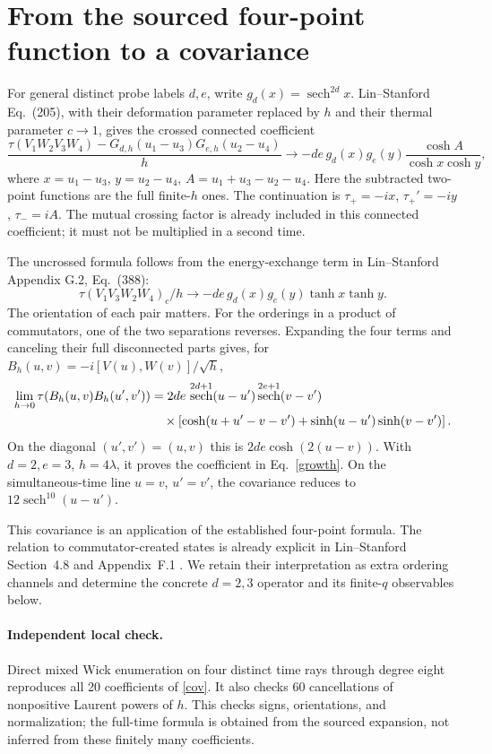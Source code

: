 \documentclass[11pt,a4paper]{article}
\newcommand{\av}[1]{\tau\!\left(#1\right)}
\DeclareMathOperator{\sech}{sech}
\begin{document}
\newpage
\section{From the sourced four-point function to a covariance}
For general distinct probe labels $d,e$, write
$g_d(x)=\sech^{2d}x$. Lin--Stanford Eq.~(205), with their deformation
parameter replaced by $h$ and their thermal parameter $c\to1$, gives
the crossed connected coefficient
\begin{equation}
 \frac{\av{V_1W_2V_3W_4}-G_{d,h}(u_1-u_3)G_{e,h}(u_2-u_4)}h
 \longrightarrow
 -de\,g_d(x)g_e(y)\frac{\cosh A}{\cosh x\cosh y},\label{cross}
\end{equation}
where $x=u_1-u_3$, $y=u_2-u_4$, $A=u_1+u_3-u_2-u_4$.
Here the subtracted two-point functions are the full finite-$h$ ones.
The continuation is $\tau_+=-ix$, $\tau_+'=-iy$, $\tau_-=iA$.
The mutual crossing factor is already included in this connected
coefficient; it must not be multiplied in a second time.

The uncrossed formula follows from the energy-exchange term in
Lin--Stanford Appendix G.2, Eq.~(388):
\begin{equation}
 \av{V_1V_3W_2W_4}_{c}/h
 \longrightarrow -de\,g_d(x)g_e(y)\tanh x\tanh y.\label{uncross}
\end{equation}
The orientation of each pair matters. For the orderings in a product of
commutators, one of the two separations reverses. Expanding the four
terms and canceling their full disconnected parts gives, for
$B_h(u,v)=-i[V(u),W(v)]/\sqrt h$,
\begin{align}
 \lim_{h\to0}\av{B_h(u,v)B_h(u',v')}
 &=2de\,\sech^{2d+1}(u-u')\sech^{2e+1}(v-v')\notag\\
 &\quad\times\left[\cosh(u+u'-v-v')
              +\sinh(u-u')\sinh(v-v')\right].\label{cov}
\end{align}
On the diagonal $(u',v')=(u,v)$ this is $2de\cosh(2(u-v))$.
With $d=2,e=3$, $h=4\lambda$, it proves the coefficient in
Eq.~\eqref{growth}. On the simultaneous-time line $u=v$, $u'=v'$,
the covariance reduces to $12\sech^{10}(u-u')$.

This covariance is an application of the established four-point
formula. The relation to commutator-created states is already explicit
in Lin--Stanford Section~4.8 and Appendix~F.1 \cite{LS}. We retain
their interpretation as extra ordering channels and determine the
concrete $d=2,3$ operator and its finite-$q$ observables below.

\paragraph{Independent local check.}
Direct mixed Wick enumeration on four distinct time rays through
degree eight reproduces all 20 coefficients of \eqref{cov}. It also
checks 60 cancellations of nonpositive Laurent powers of $h$.
This checks signs, orientations, and normalization; the full-time
formula is obtained from the sourced expansion, not inferred from
these finitely many coefficients.
\end{document}
